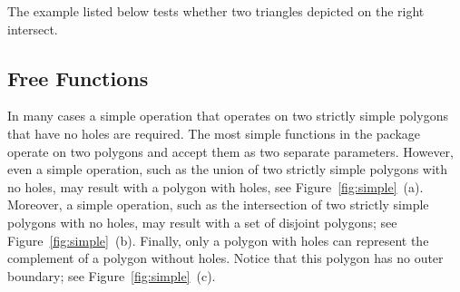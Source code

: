 The example listed below tests whether two triangles depicted on the
right intersect.


%
% 
% 
%

\subsection{Free Functions}
\label{bobs_ssec:free_functions}
In many cases a simple operation that operates on two strictly simple
polygons that have no holes are required. The most simple functions in
the package operate on two polygons and accept them as two separate
parameters. However, even a simple operation, such as the union of two
strictly simple polygons with no holes, may result with a polygon with
holes, see Figure~\ref{fig:simple}~(a). Moreover, a simple operation,
such as the intersection of two strictly simple polygons with no
holes, may result with a set of disjoint polygons; see
Figure~\ref{fig:simple}~(b). Finally, only a polygon with holes can
represent the complement of a polygon without holes. Notice that this
polygon has no outer boundary; see Figure~\ref{fig:simple}~(c).

